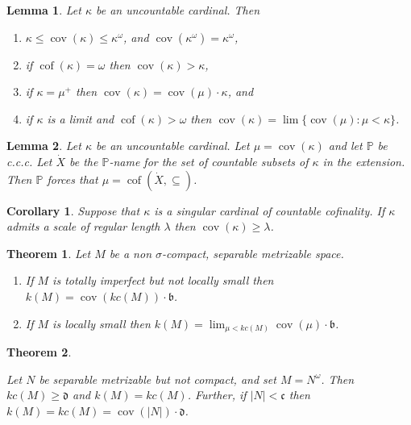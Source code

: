 \documentclass[10pt,a4paper]{amsart}
\newtheorem{lem}{Lemma}
\newtheorem{cor}{Corollary}
\newtheorem{thm}{Theorem}
\DeclareMathOperator{\cof}{cof}
\begin{document}
\begin{lem} \label{l:sam1} 
Let $\kappa$ be an uncountable cardinal. Then
\begin{enumerate}[noitemsep,topsep=1pt]
\item[(i)]  $\kappa \le \mathop{cov}(\kappa) \le \kappa^\omega$, and $\mathop{cov}(\kappa^\omega)=\kappa^\omega$, 

\item[(ii)] if $\cof(\kappa)=\omega$ then $\mathop{cov}(\kappa) > \kappa$,

\item[(iii)] if $\kappa=\mu^+$ then     $\mathop{cov}(\kappa) = \mathop{cov}(\mu)\cdot\kappa$,  and

\item[(iv)] if $\kappa$ is a limit and $\cof(\kappa)>\omega$  then $\mathop{cov}(\kappa)=\lim \{\mathop{cov}(\mu) : \mu<\kappa\}$. 
\end{enumerate}
\end{lem}

\begin{lem}\label{lem:cccPreservesCapturing}
    Let $\kappa$ be an uncountable cardinal.
        Let $\mu=\mathop{cov}(\kappa)$ and let $\mathbb{P}$ be c.c.c. Let $\dot{X}$ be the $\mathbb{P}$-name for the set of countable subsets of $\kappa$ in the extension. Then $\mathbb{P}$ forces that $\mu=\cof(\dot{X},\subseteq)$.
\end{lem}

\begin{cor}\label{cor:ScalesIncreaseSam}
    Suppose that $\kappa$ is a singular cardinal of countable cofinality. If $\kappa$ admits a scale of regular length $\lambda$ then $\mathop{cov}(\kappa)\geq\lambda$. 
\end{cor}

\begin{thm}\label{th:k=sam}
Let $M$ be a non $\sigma$-compact, separable metrizable space.
\begin{enumerate}[noitemsep,topsep=1pt]
\item[(i)] If $M$ is totally imperfect but not locally small then 
$k(M)=\mathop{cov}(kc(M))\cdot\mathfrak{b}$.

\item[(ii)] If $M$ is locally small then 
$
k(M)=\lim_{\mu < kc(M)} \mathop{cov}(\mu)\cdot\mathfrak{b}$. 
\end{enumerate}
\end{thm}

\begin{thm}\label{th:powers} 

    Let $N$ be separable metrizable but not compact, and set $M=N^\omega$. Then $kc(M) \ge \mathfrak{d}$ and $k(M)=kc(M)$.     
    Further, if $|N|<\mathfrak{c}$ then $k(M)=kc(M)=\mathop{cov}(|N|)\cdot \mathfrak{d}$. 
\end{thm}
\end{document}
